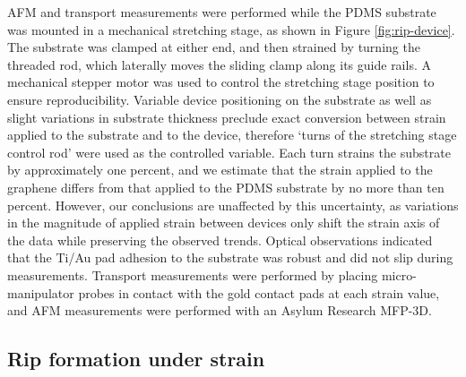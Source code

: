 \documentclass[edeposit,fullpage,draftthesis]{uiucthesis2009}
\begin{document}
        AFM and transport measurements were performed while the PDMS substrate was
        mounted in a mechanical stretching stage, as shown in Figure \ref{fig:rip-device}. The substrate
        was clamped at either end, and then strained by turning the threaded rod, which
        laterally moves the sliding clamp along its guide rails. A mechanical stepper
        motor was used to control the stretching stage position to ensure
        reproducibility. Variable device positioning on the substrate as well as slight
        variations in substrate thickness preclude exact conversion between strain
        applied to the substrate and to the device, therefore `turns of the stretching
        stage control rod' were used as the controlled variable. Each turn strains the
        substrate by approximately one percent, and we estimate that the strain applied
        to the graphene differs from that applied to the PDMS substrate by no more than
        ten percent. However, our conclusions are unaffected by this uncertainty, as
        variations in the magnitude of applied strain between devices only shift the
        strain axis of the data while preserving the observed trends. Optical
        observations indicated that the Ti/Au pad adhesion to the substrate was robust
        and did not slip during measurements. Transport measurements were performed by
        placing micro-manipulator probes in contact with the gold contact pads at each
        strain value, and AFM measurements were performed with an Asylum Research
        MFP-3D.
        
    \subsection{Rip formation under strain}
 
\end{document}
